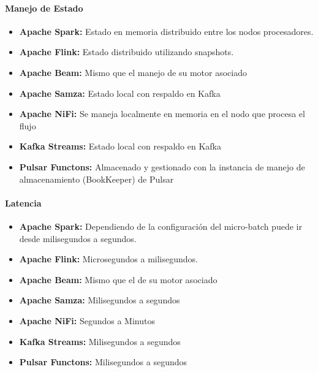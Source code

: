 \paragraph{Manejo de Estado}
\begin{itemize}
    \item \textbf{Apache Spark:} Estado en memoria distribuido entre los nodos procesadores.
    \item \textbf{Apache Flink:} Estado distribuido utilizando snapshots.
    \item \textbf{Apache Beam:} Mismo que el manejo de su motor asociado 
    \item \textbf{Apache Samza:} Estado local con respaldo en Kafka
    \item \textbf{Apache NiFi:} Se maneja localmente en memoria en el nodo que procesa el flujo
    \item \textbf{Kafka Streams:} Estado local con respaldo en Kafka
    \item \textbf{Pulsar Functons:} Almacenado y gestionado con la instancia de manejo de almacenamiento (BookKeeper) de Pulsar
\end{itemize}

\paragraph{Latencia}
\begin{itemize}
    \item \textbf{Apache Spark:} Dependiendo de la configuración del micro-batch puede ir desde milisegundos a segundos.
    \item \textbf{Apache Flink:} Microsegundos a milisegundos.
    \item \textbf{Apache Beam:} Mismo que el de su motor asociado 
    \item \textbf{Apache Samza:} Milisegundos a segundos
    \item \textbf{Apache NiFi:} Segundos a Minutos
    \item \textbf{Kafka Streams:} Milisegundos a segundos
    \item \textbf{Pulsar Functons:} Milisegundos a segundos
\end{itemize}

